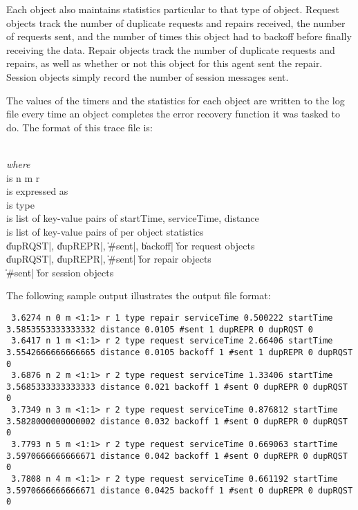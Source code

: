 \documentclass{article}
\begin{document}
Each object also maintains statistics particular to that type of object.
Request objects track the number of duplicate requests and repairs received,
the number of requests sent, and the number of times this object
had to backoff before finally receiving the data.
Repair objects track the number of duplicate requests and repairs,
as well as whether or not this object for this agent sent the repair.
Session objects simply record the number of session messages sent.

The values of the timers and the statistics for each object are written
to the log file every time an object completes the error recovery function
it was tasked to do.
The format of this trace file is:
\begin{program}
      \\[1em]
\< {\itshape where} \\
\<  is \>\>  n  m  r  \\
\>\> is expressed as \\
\<  is \>\> type  \\
\<  is \>\> list of key-value pairs of startTime, serviceTime, distance \\
\<  is \>\> list of key-value pairs of per object statistics \\
\>\>\|dupRQST|, \|dupREPR|, \|#sent|, \|backoff|  \`for request objects \\
\>\>\|dupRQST|, \|dupREPR|, \|#sent|  \`for repair objects \\
\>\>\|#sent| \`for session objects \\
\end{program}
The following sample output illustrates the output file format:
\begin{verbatim}
 3.6274 n 0 m <1:1> r 1 type repair serviceTime 0.500222 startTime 3.5853553333333332 distance 0.0105 #sent 1 dupREPR 0 dupRQST 0
 3.6417 n 1 m <1:1> r 2 type request serviceTime 2.66406 startTime 3.5542666666666665 distance 0.0105 backoff 1 #sent 1 dupREPR 0 dupRQST 0
 3.6876 n 2 m <1:1> r 2 type request serviceTime 1.33406 startTime 3.5685333333333333 distance 0.021 backoff 1 #sent 0 dupREPR 0 dupRQST 0
 3.7349 n 3 m <1:1> r 2 type request serviceTime 0.876812 startTime 3.5828000000000002 distance 0.032 backoff 1 #sent 0 dupREPR 0 dupRQST 0
 3.7793 n 5 m <1:1> r 2 type request serviceTime 0.669063 startTime 3.5970666666666671 distance 0.042 backoff 1 #sent 0 dupREPR 0 dupRQST 0
 3.7808 n 4 m <1:1> r 2 type request serviceTime 0.661192 startTime 3.5970666666666671 distance 0.0425 backoff 1 #sent 0 dupREPR 0 dupRQST 0
\end{verbatim}
\end{document}
